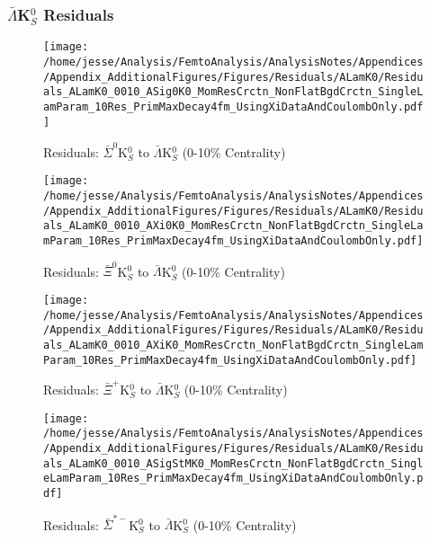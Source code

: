 \documentclass[/home/jesse/Analysis/FemtoAnalysis/AnalysisNotes/AnalysisNoteJBuxton.tex]{subfiles}
\begin{document}
\subsubsection{\texorpdfstring{$\bar{\Lambda}$K$^{0}_{S}$}{TEXT} Residuals}
\label{Residuals_ALamK0}

\begin{figure}[h]
  \centering
  \texttt{[image: /home/jesse/Analysis/FemtoAnalysis/AnalysisNotes/Appendices/Appendix\_AdditionalFigures/Figures/Residuals/ALamK0/Residuals\_ALamK0\_0010\_ASig0K0\_MomResCrctn\_NonFlatBgdCrctn\_SingleLamParam\_10Res\_PrimMaxDecay4fm\_UsingXiDataAndCoulombOnly.pdf]}
  \caption[Residuals: $\bar{\Sigma}^{0}$K$^{0}_{S}$ to $\bar{\Lambda}$K$^{0}_{S}$ (0-10\% Centrality)]{Residuals: $\bar{\Sigma}^{0}$K$^{0}_{S}$ to $\bar{\Lambda}$K$^{0}_{S}$ (0-10\% Centrality)}
  \label{fig:Res_ALamK0_0010_ASig0K0}
\end{figure}


\begin{figure}[h]
  \centering
  \texttt{[image: /home/jesse/Analysis/FemtoAnalysis/AnalysisNotes/Appendices/Appendix\_AdditionalFigures/Figures/Residuals/ALamK0/Residuals\_ALamK0\_0010\_AXi0K0\_MomResCrctn\_NonFlatBgdCrctn\_SingleLamParam\_10Res\_PrimMaxDecay4fm\_UsingXiDataAndCoulombOnly.pdf]}
  \caption[Residuals: $\bar{\Xi}^{0}$K$^{0}_{S}$ to $\bar{\Lambda}$K$^{0}_{S}$ (0-10\% Centrality)]{Residuals: $\bar{\Xi}^{0}$K$^{0}_{S}$ to $\bar{\Lambda}$K$^{0}_{S}$ (0-10\% Centrality)}
  \label{fig:Res_ALamK0_0010_AXi0K0}
\end{figure}


\begin{figure}[h]
  \centering
  \texttt{[image: /home/jesse/Analysis/FemtoAnalysis/AnalysisNotes/Appendices/Appendix\_AdditionalFigures/Figures/Residuals/ALamK0/Residuals\_ALamK0\_0010\_AXiK0\_MomResCrctn\_NonFlatBgdCrctn\_SingleLamParam\_10Res\_PrimMaxDecay4fm\_UsingXiDataAndCoulombOnly.pdf]}
  \caption[Residuals: $\bar{\Xi}^{+}$K$^{0}_{S}$ to $\bar{\Lambda}$K$^{0}_{S}$ (0-10\% Centrality)]{Residuals: $\bar{\Xi}^{+}$K$^{0}_{S}$ to $\bar{\Lambda}$K$^{0}_{S}$ (0-10\% Centrality)}
  \label{fig:Res_ALamK0_0010_AXiCK0}
\end{figure}


\begin{figure}[h]
  \centering
  \texttt{[image: /home/jesse/Analysis/FemtoAnalysis/AnalysisNotes/Appendices/Appendix\_AdditionalFigures/Figures/Residuals/ALamK0/Residuals\_ALamK0\_0010\_ASigStMK0\_MomResCrctn\_NonFlatBgdCrctn\_SingleLamParam\_10Res\_PrimMaxDecay4fm\_UsingXiDataAndCoulombOnly.pdf]}
  \caption[Residuals: $\bar{\Sigma}^{*-}$K$^{0}_{S}$ to $\bar{\Lambda}$K$^{0}_{S}$ (0-10\% Centrality)]{Residuals: $\bar{\Sigma}^{*-}$K$^{0}_{S}$ to $\bar{\Lambda}$K$^{0}_{S}$ (0-10\% Centrality)}
  \label{fig:Res_ALamK0_0010_ASigStMK0}
\end{figure}
\end{document}
